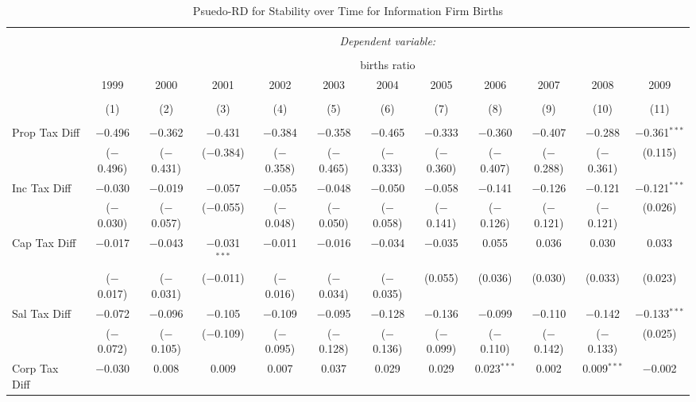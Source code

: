 
\begin{table}[!htbp] \centering 
  \caption{Psuedo-RD for Stability over Time for  Information Firm Births} 
  \label{51year} 
\small 
\begin{tabular}{@{\extracolsep{5pt}}lccccccccccc} 
\\[-1.8ex]\hline 
\hline \\[-1.8ex] 
 & \multicolumn{11}{c}{\textit{Dependent variable:}} \\ 
\cline{2-12} 
\\[-1.8ex] & \multicolumn{11}{c}{births ratio} \\ 
 & 1999 & 2000 & 2001 & 2002 & 2003 & 2004 & 2005 & 2006 & 2007 & 2008 & 2009 \\ 
\\[-1.8ex] & (1) & (2) & (3) & (4) & (5) & (6) & (7) & (8) & (9) & (10) & (11)\\ 
\hline \\[-1.8ex] 
 Prop Tax Diff & $-$0.496 & $-$0.362 & $-$0.431 & $-$0.384 & $-$0.358 & $-$0.465 & $-$0.333 & $-$0.360 & $-$0.407 & $-$0.288 & $-$0.361$^{***}$ \\ 
  & ($-$0.496) & ($-$0.431) & ($-$0.384) & ($-$0.358) & ($-$0.465) & ($-$0.333) & ($-$0.360) & ($-$0.407) & ($-$0.288) & ($-$0.361) & (0.115) \\ 
  Inc Tax Diff & $-$0.030 & $-$0.019 & $-$0.057 & $-$0.055 & $-$0.048 & $-$0.050 & $-$0.058 & $-$0.141 & $-$0.126 & $-$0.121 & $-$0.121$^{***}$ \\ 
  & ($-$0.030) & ($-$0.057) & ($-$0.055) & ($-$0.048) & ($-$0.050) & ($-$0.058) & ($-$0.141) & ($-$0.126) & ($-$0.121) & ($-$0.121) & (0.026) \\ 
  Cap Tax Diff & $-$0.017 & $-$0.043 & $-$0.031$^{***}$ & $-$0.011 & $-$0.016 & $-$0.034 & $-$0.035 & 0.055 & 0.036 & 0.030 & 0.033 \\ 
  & ($-$0.017) & ($-$0.031) & ($-$0.011) & ($-$0.016) & ($-$0.034) & ($-$0.035) & (0.055) & (0.036) & (0.030) & (0.033) & (0.023) \\ 
  Sal Tax Diff & $-$0.072 & $-$0.096 & $-$0.105 & $-$0.109 & $-$0.095 & $-$0.128 & $-$0.136 & $-$0.099 & $-$0.110 & $-$0.142 & $-$0.133$^{***}$ \\ 
  & ($-$0.072) & ($-$0.105) & ($-$0.109) & ($-$0.095) & ($-$0.128) & ($-$0.136) & ($-$0.099) & ($-$0.110) & ($-$0.142) & ($-$0.133) & (0.025) \\ 
  Corp Tax Diff & $-$0.030 & 0.008 & 0.009 & 0.007 & 0.037 & 0.029 & 0.029 & 0.023$^{***}$ & 0.002 & 0.009$^{***}$ & $-$0.002 \\ 

\end{tabular}
\end{table}
